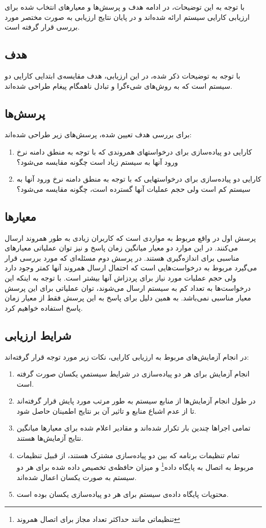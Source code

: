 با توجه به این توضیحات، در ادامه هدف و پرسش‌ها و معیارهای انتخاب شده برای ارزیابی کارایی سیستم ارائه شده‌اند و در پایان نتایج ارزیابی به صورت مختصر مورد بررسی قرار گرفته است.
\subsection{هدف}
با توجه به توضیحات ذکر شده، در این ارزیابی، هدف مقایسه‌ی ابتدایی کارایی دو سیستم است که به روش‌های شیءگرا و تبادل ناهمگام پیغام طراحی شده‌اند. 
\subsection{پرسش‌ها}
برای بررسی هدف تعیین شده، پرسش‌های زیر طراحی شده‌اند:
\begin{enumerate}
\item کارایی دو پیاده‌سازی برای درخواستهای همروندی که با توجه به منطق دامنه نرخ ورود آنها به سیستم زیاد است چگونه مقایسه می‌شود؟\\

\item کارایی دو پیاده‌سازی برای درخواستهایی که با توجه به منطق دامنه نرخ ورود آنها به سیستم کم است ولی حجم عملیات آنها گسترده است، چگونه مقایسه می‌شود؟

\end{enumerate}
\subsection{معیارها}
پرسش اول در واقع مربوط به مواردی است که کاربران زیادی به طور همروند ارسال می‌کنند. در این موارد دو معیار میانگین زمان پاسخ و نیز \gls{توان عملیاتی} معیارهای مناسبی برای اندازه‌گیری هستند. در پرسش دوم مسئله‌ای که مورد بررسی قرار می‌گیرد مربوط به درخواست‌هایی است که احتمال ارسال همروند آنها کمتر وجود دارد ولی حجم عملیات مورد نیاز برای پردزاش آنها بیشتر است. با توجه به اینکه این درخواست‌ها به تعداد کم به سیستم ارسال می‌شوند، توان عملیاتی برای این پرسش معیار مناسبی نمی‌باشد. به همین دلیل برای پاسخ به این پرسش فقط از معیار زمان پاسخ استفاده خواهیم کرد.

\subsection{شرایط ارزیابی}
در انجام آزمایش‌های مربوط به ارزیابی کارایی، نکات زیر مورد توجه قرار گرفته‌اند:
\begin{enumerate}
\item انجام آزمایش برای هر دو پیاده‌سازی در شرایط سیستمیِ یکسان صورت گرفته است.
\item در طول انجام آزمایش‌ها از منابع سیستم به طور مرتب مورد پایش قرار گرفته‌اند تا از عدم اشباع منابع و تاثیر آن بر نتایج اطمینان حاصل شود.
\item تمامی اجراها چندین بار تکرار شده‌اند و مقادیر اعلام شده برای معیارها میانگین نتایج آزمایش‌ها هستند.
\item تمام تنظیمات برنامه که بین دو پیاده‌سازی مشترک هستند، از قبیل تنظیمات مربوط به اتصال به پایگاه داده\footnote{تنظیماتی مانند حداکثر تعداد مجاز برای اتصال همروند} و میزان حافظه‌ی تخصیص داده شده برای هر دو سیستم به صورت یکسان اعمال شده‌اند.  
\item محتویات پایگاه داده‌ی سیستم برای هر دو پیاده‌سازی یکسان بوده است.
\end{enumerate}
